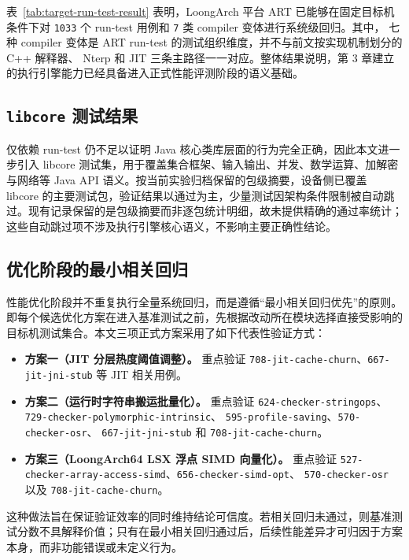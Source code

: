 表~\ref{tab:target-run-test-result} 表明，LoongArch 平台 ART 已能够在固定目标机条件下对
\texttt{1033} 个 run-test 用例和 \texttt{7} 类 compiler 变体进行系统级回归。其中，
七种 compiler 变体是 ART run-test 的测试组织维度，并不与前文按实现机制划分的 C++ 解释器、
Nterp 和 JIT 三条主路径一一对应。整体结果说明，第 3 章建立的执行引擎能力已经具备进入正式性能评测阶段的语义基础。

\subsection{\texorpdfstring{\texttt{libcore} 测试结果}{libcore 测试结果}}

仅依赖 run-test 仍不足以证明 Java 核心类库层面的行为完全正确，因此本文进一步引入 libcore 测试集，用于覆盖集合框架、输入输出、并发、数学运算、加解密与网络等 Java API 语义。按当前实验归档保留的包级摘要，设备侧已覆盖 libcore 的主要测试包，验证结果以通过为主，少量测试因架构条件限制被自动跳过。现有记录保留的是包级摘要而非逐包统计明细，故未提供精确的通过率统计；这些自动跳过项不涉及执行引擎核心语义，不影响主要正确性结论。

\subsection{优化阶段的最小相关回归}

性能优化阶段并不重复执行全量系统回归，而是遵循“最小相关回归优先”的原则。即每个候选优化方案在进入基准测试之前，先根据改动所在模块选择直接受影响的目标机测试集合。本文三项正式方案采用了如下代表性验证方式：
\begin{itemize}
    \item \textbf{方案一（JIT 分层热度阈值调整）。} 重点验证 \texttt{708-jit-cache-churn}、\texttt{667-jit-jni-stub} 等 JIT 相关用例。
    \item \textbf{方案二（运行时字符串搬运批量化）。} 重点验证
    \texttt{624-checker-stringops}、\texttt{729-checker-polymorphic-intrinsic}、
    \texttt{595-profile-saving}、\texttt{570-checker-osr}、
    \texttt{667-jit-jni-stub} 和 \texttt{708-jit-cache-churn}。
    \item \textbf{方案三（LoongArch64 LSX 浮点 SIMD 向量化）。} 重点验证
    \texttt{527-checker-array-access-simd}、\texttt{656-checker-simd-opt}、
    \texttt{570-checker-osr} 以及 \texttt{708-jit-cache-churn}。
\end{itemize}

这种做法旨在保证验证效率的同时维持结论可信度。若相关回归未通过，则基准测试分数不具解释价值；只有在最小相关回归通过后，后续性能差异才可归因于方案本身，而非功能错误或未定义行为。

